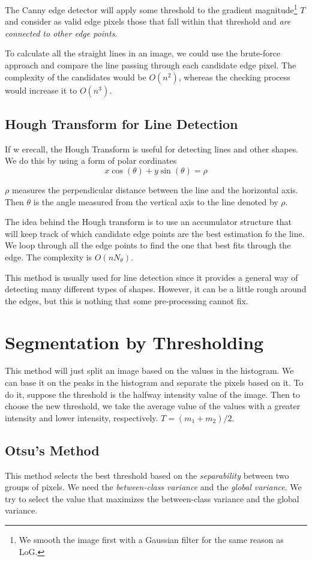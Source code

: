 \documentclass{tufte-handout}
\begin{document}
The Canny edge detector will apply some threshold to the gradient magnitude\footnote{We smooth the image first with a Gaussian filter for the same reason as LoG.}
$T$ and
consider as valid edge pixels those that fall within that threshold and 
\emph{are connected to other edge points}.

To calculate all the straight lines in an image, we could use the brute-force approach 
and compare the line passing through each candidate edge pixel. The complexity of the 
candidates would be $O(n^{2})$, whereas the checking process would increase it 
to $O(n^{3})$.

\subsection{Hough Transform for Line Detection}
If w erecall, the Hough Transform is useful for detecting lines and other shapes. We do 
this by using a form of polar cordinates
\[x\cos(\theta) + y\sin(\theta) = \rho\]

$\rho$ measures the perpendicular distance between the line and the horizontal axis.
Then $\theta$ is the angle measured from the vertical axis to the line denoted by 
$\rho$. 

The idea behind the Hough transform is to use an accumulator structure that will keep 
track of which candidate edge points are the best estimation fo the line. We loop through
all the edge points to find the one that best fits through the edge. The complexity is 
$O(nN_{\theta})$.

This method is usually used for line detection since it provides a general way of detecting
many different types of shapes. However, it can be a little rough around the edges, 
but this is nothing that some pre-processing cannot fix.

\section{Segmentation by Thresholding}
This method will just split an image based on the values in the histogram. We can base
it on the peaks in the histogram and separate the pixels based on it.
To do it, suppose the threshold is the halfway intensity value of the image. 
Then to choose the new threshold, we take the average value of the values with 
a greater intensity and lower intensity, respectively. $T=(m_{1} + m_{2}) / 2$.

\subsection{Otsu's Method}
This method selects the best threshold based on the \emph{separability} between 
two groups of pixels. We need the \emph{between-class variance} and the \emph{global
variance}. We try to select the value that maximizes the between-class variance
and the global variance.
\end{document}

